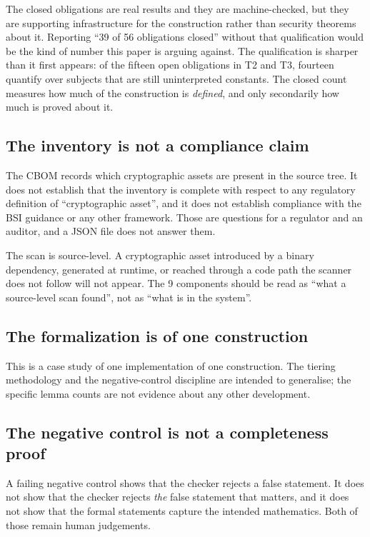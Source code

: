 The closed obligations are real results and they are machine-checked, but they
are supporting infrastructure for the construction rather than security theorems
about it. Reporting ``39 of 56 obligations closed'' without that qualification
would be the kind of number this paper is arguing against. The qualification is
sharper than it first appears: of the fifteen open obligations in T2 and T3,
fourteen quantify over subjects that are still uninterpreted constants. The
closed count measures how much of the construction is \emph{defined}, and only
secondarily how much is proved about it.

\subsection{The inventory is not a compliance claim}

The CBOM records which cryptographic assets are present in the source tree. It
does not establish that the inventory is complete with respect to any regulatory
definition of ``cryptographic asset'', and it does not establish compliance with
the BSI guidance or any other framework. Those are questions for a regulator and
an auditor, and a JSON file does not answer them.

The scan is source-level. A cryptographic asset introduced by a binary
dependency, generated at runtime, or reached through a code path the scanner does
not follow will not appear. The 9 components should be read as ``what a
source-level scan found'', not as ``what is in the system''.

\subsection{The formalization is of one construction}

This is a case study of one implementation of one construction. The tiering
methodology and the negative-control discipline are intended to generalise; the
specific lemma counts are not evidence about any other development.

\subsection{The negative control is not a completeness proof}

A failing negative control shows that the checker rejects a false statement. It
does not show that the checker rejects \emph{the} false statement that matters,
and it does not show that the formal statements capture the intended mathematics.
Both of those remain human judgements.

